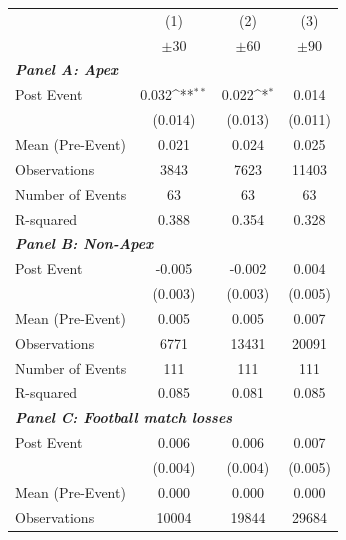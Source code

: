 {
\def\sym#1{\ifmmode^{#1}\else\(^{#1}\)\fi}
\begin{tabular}{l*{3}{c}}
\toprule
&\multicolumn{1}{c}{(1)}&\multicolumn{1}{c}{(2)}&\multicolumn{1}{c}{(3)}\\
&\multicolumn{1}{c}{$\pm 30$}&\multicolumn{1}{c}{$\pm 60$}&\multicolumn{1}{c}{$\pm 90$}\\
\midrule \multicolumn{4}{l}{\textbf{\textit{Panel A: Apex}}} \\
Post Event  &       0.032\sym{**} &       0.022\sym{*}  &       0.014         \\
&     (0.014)         &     (0.013)         &     (0.011)         \\
\midrule
Mean (Pre-Event)&       0.021         &       0.024         &       0.025         \\
Observations&        3843         &        7623         &       11403         \\
Number of Events&          63         &          63         &          63         \\
R-squared   &       0.388         &       0.354         &       0.328         \\
\midrule
\multicolumn{4}{l}{\textbf{\textit{Panel B: Non-Apex}}} \\
Post Event  &      -0.005         &      -0.002         &       0.004         \\
&     (0.003)         &     (0.003)         &     (0.005)         \\
\midrule
Mean (Pre-Event)&       0.005         &       0.005         &       0.007         \\
Observations&        6771         &       13431         &       20091         \\
Number of Events&         111         &         111         &         111         \\
R-squared   &       0.085         &       0.081         &       0.085         \\
\bottomrule
\multicolumn{4}{l}{\textbf{\textit{Panel C: Football match losses}}} \\
Post Event  &       0.006         &       0.006         &       0.007         \\
&     (0.004)         &     (0.004)         &     (0.005)         \\
\midrule
Mean (Pre-Event)&       0.000         &       0.000         &       0.000         \\
Observations&       10004         &       19844         &       29684         \\

\end{tabular}}
